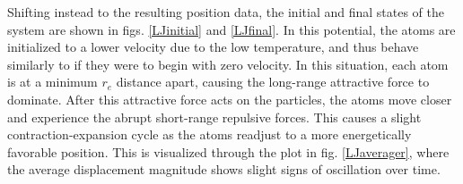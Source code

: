 \documentclass[12pt]{article}
\begin{document}
Shifting instead to the resulting position data, the initial and final states of the system are shown in figs. \ref{LJinitial} and \ref{LJfinal}.  In this potential, the atoms are initialized to a lower velocity due to the low temperature, and thus behave similarly to if they were to begin with zero velocity.  In this situation, each atom is at a minimum $r_e$ distance apart, causing the long-range attractive force to dominate.  After this attractive force acts on the particles, the atoms move closer and experience the abrupt short-range repulsive forces.  This causes a slight contraction-expansion cycle as the atoms readjust to a more energetically favorable position.  This is visualized through the plot in fig. \ref{LJaverager}, where the average displacement magnitude shows slight signs of oscillation over time.
\end{document}
